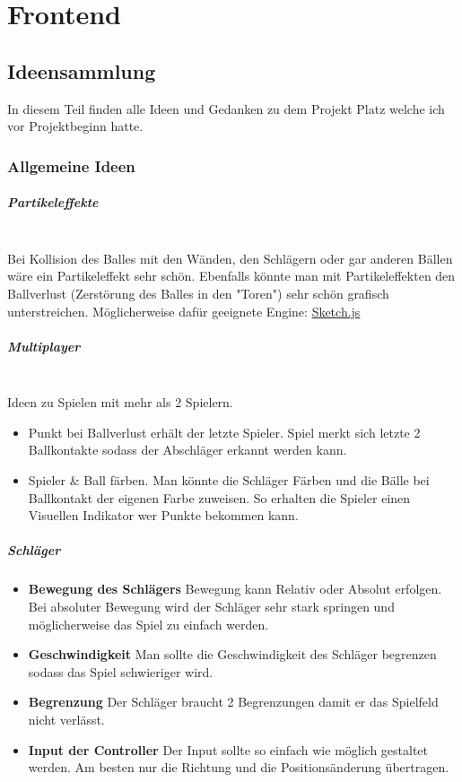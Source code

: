 \chapter{Frontend}
\section{Ideensammlung}
In diesem Teil finden alle Ideen und Gedanken zu dem Projekt Platz welche ich vor Projektbeginn hatte.
\subsection{Allgemeine Ideen}
\paragraph{Partikeleffekte}
\mbox{}\\
Bei Kollision des Balles mit den Wänden, den Schlägern oder gar anderen Bällen wäre ein Partikeleffekt sehr schön.
\newline
Ebenfalls könnte man mit Partikeleffekten den Ballverlust (Zerstörung des Balles in den "Toren") sehr schön grafisch unterstreichen.
\newline
Möglicherweise dafür geeignete Engine:
\href{http://soulwire.github.io/sketch.js/}{Sketch.js}
\paragraph{Multiplayer}
\mbox{}\\
Ideen zu Spielen mit mehr als 2 Spielern.
\begin{itemize}
	\item Punkt bei Ballverlust erhält der letzte Spieler. Spiel merkt sich letzte 2 Ballkontakte sodass der Abschläger erkannt werden kann.
	\item Spieler & Ball färben. Man könnte die Schläger Färben und die Bälle bei Ballkontakt der eigenen Farbe zuweisen. So erhalten die Spieler einen Visuellen Indikator wer Punkte bekommen kann.
\end{itemize}
\newpage
\paragraph{Schläger}
\begin{itemize}
\item
\textbf{Bewegung des Schlägers} Bewegung kann Relativ oder Absolut erfolgen. Bei absoluter Bewegung wird der Schläger sehr stark springen und möglicherweise das Spiel zu einfach werden.
\item
\textbf{Geschwindigkeit} Man sollte die Geschwindigkeit des Schläger begrenzen sodass das Spiel  schwieriger wird.
\item
\textbf{Begrenzung} Der Schläger braucht 2 Begrenzungen damit er das Spielfeld nicht verlässt.
\item
\textbf{Input der Controller} Der Input sollte so einfach wie möglich gestaltet werden. Am besten nur die Richtung und die Positionsänderung übertragen.
\end{itemize}
\newline

